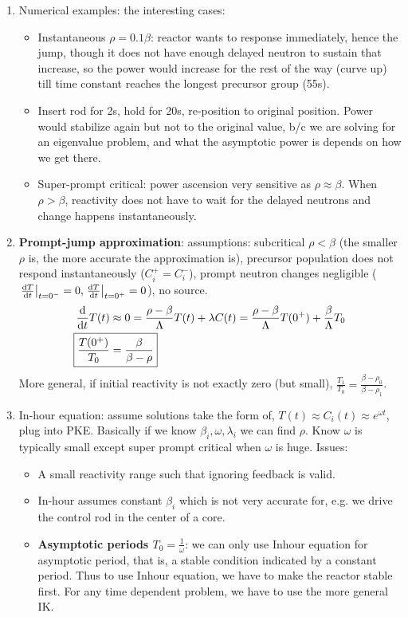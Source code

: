 \documentclass{school-22.211-notes}
\begin{document}
\begin{enumerate}
\item Numerical examples: the interesting cases: 
  \begin{itemize}
  \item Instantaneous $\rho = 0.1 \beta$: reactor wants to response immediately, hence the jump, though it does not have enough delayed neutron to sustain that increase, so the power would increase for the rest of the way (curve up) till time constant reaches the longest precursor group (55s). 
  \item Insert rod for 2s, hold for 20s, re-position to original position. Power would stabilize again but not to the original value, b/c we are solving for an eigenvalue problem, and what the asymptotic power is depends on how we get there. 
  \item Super-prompt critical: power ascension very sensitive as $\rho \approx \beta$. When $\rho > \beta$, reactivity does not have to wait for the delayed neutrons and change happens instantaneously. 
  \end{itemize}

\item \textbf{Prompt-jump approximation}: assumptions: subcritical $\rho < \beta$ (the smaller $\rho$ is, the more accurate the approximation is), precursor population does not respond instantaneously ($C_i^+ = C_i^-$), prompt neutron changes negligible ($\left. \frac{\mathrm{d}T}{\mathrm{d}t} \right|_{t = 0^-} = 0, \left. \frac{\mathrm{d}T}{\mathrm{d}t} \right|_{t = 0^+} = 0$), no source. 
  \begin{align}
    \ddt T(t) &\approx 0 = \frac{\rho - \beta}{\Lambda} T(t) + \lambda C(t) = \frac{\rho- \beta}{\Lambda} T(0^+) + \frac{\beta}{\Lambda} T_0 \\
    \Aboxed{ \frac{T(0^+)}{T_0} &= \frac{\beta}{\beta - \rho} }
  \end{align}
  More general, if initial reactivity is not exactly zero (but small), $\displaystyle \frac{T_1}{T_0} = \frac{\beta - \rho_0}{\beta - \rho_1}$. 

\item In-hour equation: assume solutions take the form of, $T(t) \approx C_i (t) \approx e^{\omega t}$, plug into PKE. Basically if we know $\beta_i, \omega, \lambda_i$ we can find $\rho$. Know $\omega$ is typically small except super prompt critical when $\omega$ is huge. 
  Issues:
  \begin{itemize}
  \item A small reactivity range such that ignoring feedback is valid. 
  \item In-hour assumes constant $\beta_i$ which is not very accurate for, e.g. we drive the control rod in the center of a core. 
  \item \textbf{Asymptotic periods $T_0 = \frac{1}{\omega}$}: we can only use Inhour equation for asymptotic period, that is, a stable condition indicated by a constant period. Thus to use Inhour equation, we have to make the reactor stable first. For any time dependent problem, we have to use the more general IK. 
  \end{itemize}


\end{enumerate}
\end{document}

